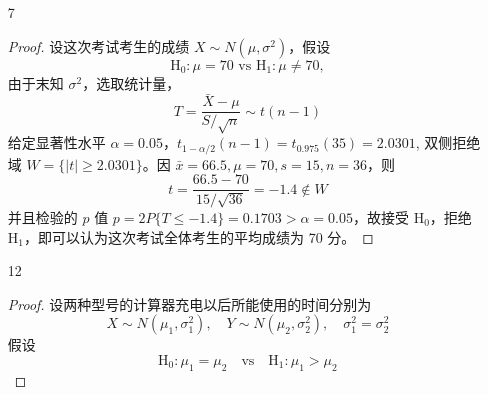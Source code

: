 \documentclass[normal,cn]{elegantnote}
\begin{document}
\begin{enumerate}
\begin{proof}
\begin{enumerate}
                      \begin{equation*}
                          \bar{x}=100.104,\quad\mu=100,\quad s=0.4760,\quad n=10
                      \end{equation*}
                      则
                      \begin{equation*}
                          t=\frac{100.104-100}{0.4760/\sqrt{10}}=0.6909\notin W
                      \end{equation*}
                      故接受原假设，即不能认为 $\mu>100$。
            \end{enumerate}
        \end{proof}
    \item[7]
        \begin{proof}
            设这次考试考生的成绩 $X\sim N\left(\mu,\sigma^{2}\right)$，假设 \begin{equation*}
                \mathrm{H}_{0}:\mu=70 \text{ vs }\mathrm{H}_{1}:\mu\neq 70,
            \end{equation*}
            由于末知 $\sigma^{2}$，选取统计量，
            \begin{equation*}
                T=\frac{\bar{X}-\mu}{S/\sqrt{n}}\sim t(n-1)
            \end{equation*}
            给定显著性水平 $\alpha=0.05$，$t_{1-\alpha/2}(n-1)=t_{0.975}(35)=2.0301$, 双侧拒绝域 $W=\{|t|\geq 2.0301\}$。因 $\bar{x}=66.5,\mu=70,s=15,n=36$，则
            \begin{equation*}
                t=\frac{66.5-70}{15 /\sqrt{36}}=-1.4\notin W
            \end{equation*}
            并且检验的 $p$ 值 $p=2P\{T \leq-1.4\}=0.1703>\alpha=0.05$，故接受 $\mathrm{H}_{0}$，拒绝 $\mathrm{H}_{1}$，即可以认为这次考试全体考生的平均成绩为 70 分。
        \end{proof}
    \item[12]
        \begin{proof}
            设两种型号的计算器充电以后所能使用的时间分别为
            \begin{equation*}
                X\sim N\left(\mu_{1},\sigma_{1}^{2}\right),\quad Y\sim N\left(\mu_{2},\sigma_{2}^{2}\right),\quad\sigma_{1}^{2}=\sigma_{2}^{2}
            \end{equation*}
            假设
            \begin{equation*}
                \mathrm{H}_{0}:\mu_{1}=\mu_{2}\quad\text{vs}\quad \mathrm{H}_{1}:\mu_{1}>\mu_{2}
            \end{equation*}

\end{proof}
\end{enumerate}
\end{document}
